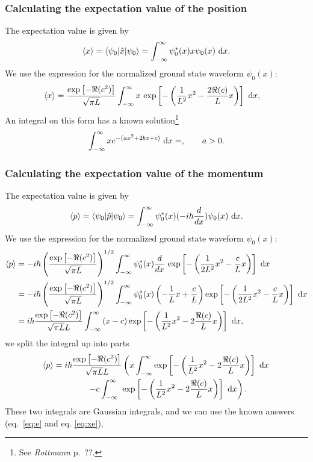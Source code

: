 \documentclass[a4paper, 11pt, titlepage, english]{article}
\newcommand{\op}[1]{\hat{#1}}
\newcommand{\braopket}[3]{\langle #1 | \op{#2} | #3 \rangle}
\begin{document}
\subsubsection*{Calculating the expectation value of the position}
The expectation value is given by
$$\langle x \rangle = \braopket{\psi_0}{x}{\psi_0} = \int_{-\infty}^\infty \psi_0^*(x)x \psi_0(x)  {\rm\ d}x.$$
We use the expression for the normalized ground state waveform $\psi_0(x)$:
\begin{align*}
\langle x \rangle  &=  \frac{{\rm exp}\left[-\Re(c^2)\right]}{\sqrt{\pi L}}\int_{-\infty}^\infty x{\rm\ exp}\left[-\left(\frac{1}{L^2}x^2 - \frac{2\Re(c)}{L}x \right) \right] {\rm\ d}x,
\end{align*}
An integral on this form has a known solution\footnote{See \emph{Rottmann} p.\ ??.}
\begin{equation}
\int_{-\infty}^\infty xe^{-(ax^2+2bx+c)} {\rm\ d}x = ,\qquad a>0. \label{eq:xe}
\end{equation}

\subsubsection*{Calculating the expectation value of the momentum}
The expectation value is given by
$$\langle p \rangle = \braopket{\psi_0}{p}{\psi_0} = \int_{-\infty}^\infty \psi_0^*(x) (-i\hbar\frac{d}{dx}) \psi_0(x)  {\rm\ d}x.$$
We use the expression for the normalized ground state waveform $\psi_0(x)$:
\begin{align*}
\langle p \rangle  &= -i\hbar\left(\frac{{\rm exp}\left[-\Re(c^2)\right]}{\sqrt{\pi L}}\right)^{1/2} \int_{-\infty}^\infty\psi_0^*(x) \frac{d}{dx}{\rm\ exp}\left[-\left(\frac{1}{2L^2}x^2 - \frac{c}{L}x \right) \right] {\rm\ d}x \\
&= -i\hbar\left(\frac{{\rm exp}\left[-\Re(c^2)\right]}{\sqrt{\pi L}}\right)^{1/2}\int_{-\infty}^\infty\psi_0^*(x) \left(-\frac{1}{L}x + \frac{c}{L}\right){\rm exp}\left[-\left(\frac{1}{2L^2}x^2 - \frac{c}{L}x \right) \right] {\rm\ d}x \\
&= i\hbar \frac{{\rm exp}\left[-\Re(c^2)\right]}{\sqrt{\pi L}L} \int_{-\infty}^\infty \left(x - c \right){\rm exp}\left[-\left(\frac{1}{L^2}x^2 - 2\frac{\Re(c)}{L}x \right)\right] {\rm\ d}x,
\end{align*}
we split the integral up into parts
\begin{align*}
\langle p \rangle  &= i\hbar\frac{{\rm exp}\left[-\Re(c^2)\right]}{\sqrt{\pi L}L}\left(
x\int_{-\infty}^\infty {\rm exp}\left[-\left(\frac{1}{L^2}x^2 - 2\frac{\Re(c)}{L}x \right)\right] {\rm\ d}x \right. \\ 
&\qquad\qquad  \left. - c\int_{-\infty}^\infty {\rm\ exp}\left[-\left(\frac{1}{L^2}x^2 - 2\frac{\Re(c)}{L}x\right)\right] {\rm\ d}x\right).
\end{align*}
These two integrals are Gaussian integrals, and we can use the known answers (eq.\ \ref{eq:e} and eq. \ref{eq:xe}),
\end{document}
